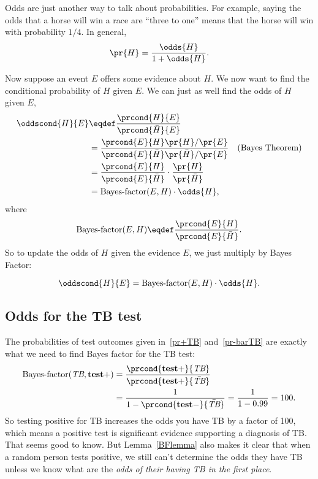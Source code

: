 Odds are just another way to talk about probabilities.  For example,
saying the odds that a horse will win a race are ``three to one''
means that the horse will win with probability $1/4$.  In general,
\[
\pr{H} = \frac{\odds{H}}{1 + \odds{H}}.
\]

Now suppose an event $E$ offers some evidence about $H$.  We now want
to find the conditional probability of $H$ given $E$.  We can just as
well find the odds of $H$ given $E$,
\begin{align*}
\oddscond{H}{E}
  & \eqdef \frac{\prcond{H}{E}}{\prcond{\bar{H}}{E}}\\
  & = \frac{\prcond{E}{H}\pr{H}/\pr{E}}{\prcond{E}{\bar{H}}\pr{\bar{H}}/\pr{E}}
          & \text{(Bayes Theorem)}\\
  & = \frac{\prcond{E}{H}}{\prcond{E}{\bar{H}}} \cdot \frac{\pr{H}}{\pr{\bar{H}}}\\
  & = \BF{E}{H} \cdot \odds{H},
\end{align*}
where
\[
\BF{E}{H} \eqdef \frac{\prcond{E}{H}}{\prcond{E}{\bar{H}}}.
\]
So to update the odds of $H$ given the evidence $E$, we just multiply
by Bayes Factor:
\begin{lemma}\label{BFlemma}
\[
\oddscond{H}{E} = \BF{E}{H} \cdot \odds{H}.
\]
\end{lemma}

\subsection{Odds for the TB test}
The probabilities of test outcomes given in~\eqref{pr+TB}
and~\eqref{pr-barTB} are exactly what we need to find Bayes factor for
the TB test:
\begin{align*}
\BF{\TB}{\testplus}
 & =\frac{\prcond{\testplus}{\TB}}{\prcond{\testplus}{\bar{\TB}}}\\
 &  =\frac{1}{1-\prcond{\testminus}{\bar{\TB}}} = \frac{1}{1 - 0.99} = 100.
\end{align*}
So testing positive for TB increases the odds you have TB by a factor
of 100, which means a positive test is significant evidence supporting
a diagnosis of TB.  That seems good to know.  But Lemma~\ref{BFlemma}
also makes it clear that when a random person tests positive, we still
can't determine the odds they have TB unless we know what are the
\emph{odds of their having TB in the first place}.


